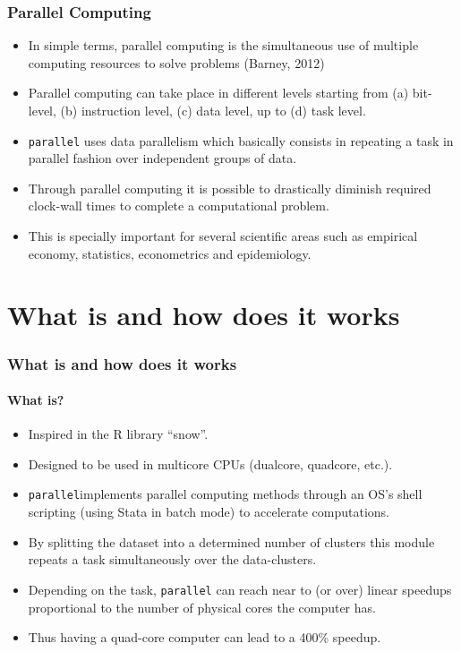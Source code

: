 \documentclass[11pt, handout]{beamer}
\begin{document}
\frame{\tableofcontents[currentsection]}

\begin{frame}[allowframebreaks=.8]
\frametitle{Parallel Computing}

\begin{itemize}[<-+>]
\item In simple terms, parallel computing is the simultaneous use of multiple computing resources to solve problems (Barney, 2012)
\item Parallel computing can take place in different levels starting from (a) bit-level, (b) instruction level, (c) data level, up to (d) task level.
\item {\tt parallel} uses data parallelism which basically consists in repeating a task in parallel fashion over independent groups of data.
\item Through parallel computing it is possible to drastically diminish required clock-wall times to complete a computational problem.
\item This is specially important for several scientific areas such as empirical economy, statistics, econometrics and epidemiology.
\end{itemize}

\end{frame}

\section{What is and how does it works}

\frame{\tableofcontents[currentsection]}

\begin{frame}[allowframebreaks=.8]
\frametitle{What is and how does it works}
\framesubtitle{What is?}

\begin{itemize}[<-+>]
\item Inspired in the R library ``snow''.
\item Designed to be used in multicore CPUs (dualcore, quadcore, etc.).
\item {\tt parallel}implements parallel computing methods through an OS's shell scripting (using Stata in batch mode) to accelerate computations.
\item By splitting the dataset into a determined number of clusters this module repeats a task simultaneously over the data-clusters.
\item Depending on the task, {\tt parallel} can reach near to (or over) linear speedups proportional to the number of physical cores the computer has.
\item Thus having a quad-core computer can lead to a 400\% speedup.
\end{itemize}

\end{frame}
\end{document}
